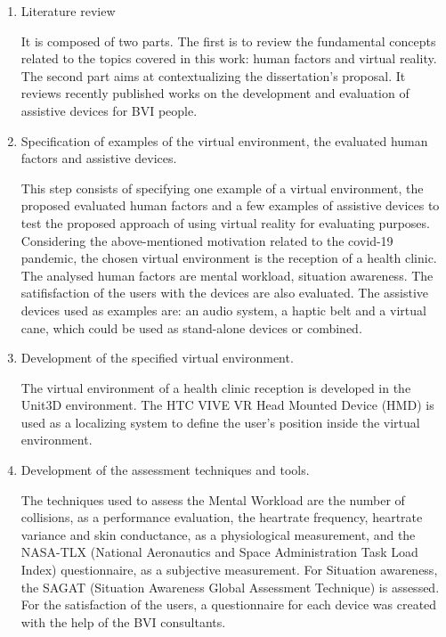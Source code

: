 \begin{enumerate}[leftmargin = 6em, label = Step \arabic* -- ]
    \item Literature review 
    
    It is composed of two parts. The first is to review the fundamental concepts related to the topics covered in this work: human factors and virtual reality. The second part aims at contextualizing the dissertation’s proposal. It reviews recently published works on the development and evaluation of assistive devices for BVI people.
    
    \item Specification of examples of the virtual environment, the evaluated human factors and assistive devices.

    This step consists of specifying one example of a virtual environment, the proposed evaluated human factors and a few examples of assistive devices to test the proposed approach of using virtual reality for evaluating purposes. Considering the above-mentioned motivation related to the covid-19 pandemic, the chosen virtual environment is the reception of a health clinic. The analysed human factors are mental workload, situation awareness. The satifisfaction of the users with the devices are also evaluated. The assistive devices used as examples are: an audio system, a haptic belt and a virtual cane, which could be used as stand-alone devices or combined.
    
    \item Development of the specified virtual environment.
    
    The virtual environment of a health clinic reception is developed in the Unit3D environment. The HTC VIVE VR Head Mounted Device (HMD) is used as a localizing system to define the user's position inside the virtual environment.

    \item Development of the assessment techniques and tools.
    
    The techniques used to assess the Mental Workload are the number of collisions, as a performance evaluation, the heartrate frequency, heartrate variance and skin conductance, as a physiological measurement, and the NASA-TLX (National Aeronautics and Space Administration Task Load Index) questionnaire, as a subjective measurement. For Situation awareness, the SAGAT (Situation Awareness Global Assessment Technique) is assessed. For the satisfaction of the users, a questionnaire for each device was created with the help of the BVI consultants.
    

\end{enumerate}
